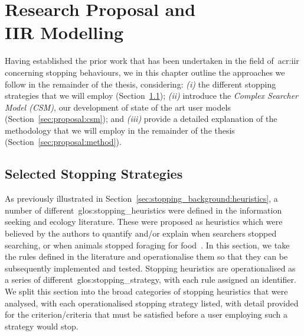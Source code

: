 
\chapter[Models and Proposal]{Research Proposal and\\IIR Modelling}\label{chap:proposal}
Having established the prior work that has been undertaken in the field of~\gls{acr:iir} concerning stopping behaviours, we in this chapter outline the approaches we follow in the remainder of the thesis, considering: \emph{(i)} the different stopping strategies that we will employ (Section~\ref{sec:proposal:strategies}); \emph{(ii)} introduce the \emph{Complex Searcher Model (CSM)}, our development of state of the art user models (Section~\ref{sec:proposal:csm}); and \emph{(iii)} provide a detailed explanation of the methodology that we will employ in the remainder of the thesis (Section~\ref{sec:proposal:method}).

\section{Selected Stopping Strategies}\label{sec:proposal:strategies}
As previously illustrated in Section~\ref{sec:stopping_background:heuristics}, a number of different~\glspl{glos:stopping_heuristic} were defined in the information seeking and ecology literature. These were proposed as heuristics which were believed by the authors to quantify and/or explain when searchers stopped searching, or when animals stopped foraging for food~\cite{maxwell2015stopping_strategies}. In this section, we take the rules defined in the literature and operationalise them so that they can be subsequently implemented and tested. Stopping heuristics are operationalised as a series of different~\gls{glos:stopping_strategy}, with each rule assigned an identifier. We split this section into the  broad categories of stopping heuristics that were analysed, with each operationalised stopping strategy listed, with detail provided for the criterion/criteria that must be satisfied before a user employing such a strategy would stop. 

